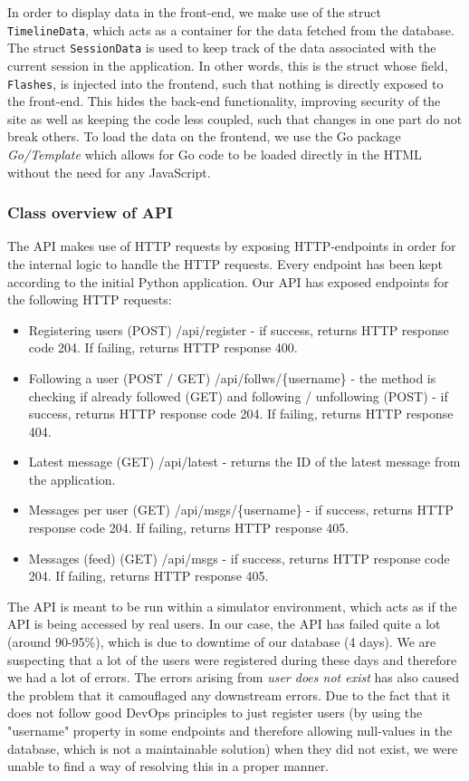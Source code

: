 In order to display data in the front-end, we make use of the struct \texttt{TimelineData}, which acts as a container for the data fetched from the database. The struct \texttt{SessionData} is used to keep track of the data associated with the current session in the application. In other words, this is the struct whose field, \texttt{Flashes}, is injected into the frontend, such that nothing is directly exposed to the front-end. This hides the back-end functionality, improving security of the site as well as keeping the code less coupled, such that changes in one part do not break others. To load the data on the frontend, we use the Go package \textit{Go/Template} which allows for Go code to be loaded directly in the HTML without the need for any JavaScript.

\subsubsection*{Class overview of API}
The API makes use of HTTP requests by exposing HTTP-endpoints in order for the internal logic to handle the HTTP requests. Every endpoint has been kept according to the initial Python application.  
Our API has exposed endpoints for the following HTTP requests:
\begin{itemize}
    \item Registering users (POST) /api/register - if success, returns HTTP response code 204. If failing, returns HTTP response 400.
    \item Following a user (POST / GET) /api/follws/\{username\} - the method is checking if already followed (GET) and following / unfollowing (POST)  - if success, returns HTTP response code 204. If failing, returns HTTP response 404.
    \item Latest message (GET) /api/latest  - returns the ID of the latest message from the application.
    \item Messages per user (GET) /api/msgs/\{username\} - if success, returns HTTP response code 204. If failing, returns HTTP response 405.
    \item Messages (feed) (GET) /api/msgs - if success, returns HTTP response code 204. If failing, returns HTTP response 405.
\end{itemize}

The API is meant to be run within a simulator environment, which acts as if the API is being accessed by real users. In our case, the API has failed quite a lot (around 90-95\%), which is due to downtime of our database (4 days). We are suspecting that a lot of the users were registered during these days and therefore we had a lot of errors. The errors arising from \textit{user does not exist} has also caused the problem that it camouflaged any downstream errors. Due to the fact that it does not follow good DevOps principles to just register users (by using the "username" property in some endpoints and therefore allowing null-values in the database, which is not a maintainable solution) when they did not exist, we were unable to find a way of resolving this in a proper manner.

